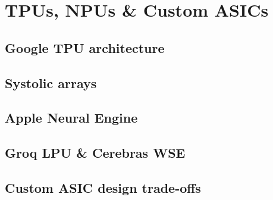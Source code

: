 
\section{TPUs, NPUs \& Custom ASICs}

\subsection{Google TPU architecture}


\subsection{Systolic arrays}


\subsection{Apple Neural Engine}


\subsection{Groq LPU \& Cerebras WSE}


\subsection{Custom ASIC design trade-offs}


